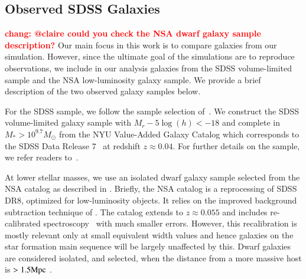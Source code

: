 \documentclass[preprint2,tighten]{aastex62}
\newcommand{\todo}[1]{{\bf \textcolor{red}{ #1}}}
\begin{document}
\subsection{Observed SDSS Galaxies} \label{sec:obvs}
\todo{chang: @claire could you check the NSA dwarf galaxy sample description?}
Our main focus in this work is to compare galaxies from our simulation. 
However, since the ultimate goal of the simulations are to reproduce 
observations, we include in our analysis galaxies from the 
SDSS volume-limited sample and the NSA low-luminosity galaxy sample. 
We provide a brief description of the two observed galaxy samples 
below. 

For the SDSS sample, we follow the sample selection of~\cite{tinker2011}. 
We construct the SDSS volume-limited galaxy sample with $M_r - 5\log(h) < -18$ 
and complete in $M_* > 10^{9.7} M_\odot$ from the NYU Value-Added 
Galaxy Catalog \citep[VAGC;][]{blanton2005} which corresponds to 
the SDSS Data Release 7~\citep[DR7;][]{abazajian2009} at redshift 
$z \approx 0.04$. For further details on the sample, we refer readers 
to~\cite{tinker2011,wetzel2013,hahn2017}.

At lower stellar masses, we use an isolated dwarf galaxy sample selected from the NSA catalog as described in \citet{geha2012}. Briefly, the NSA catalog is a reprocessing of SDSS DR8, optimized for low-luminosity 
objects. It relies on the improved background subtraction technique of 
\cite{blanton2011}. The catalog extends to $z \approx 0.055$ and includes 
re-calibrated spectroscopy~\citep{yan2011,yan2012} with much
smaller errors. However, this recalibration is mostly relevant only at small 
equivalent width values and hence galaxies on the star formation main 
sequence will be largely unaffected by this. Dwarf galaxies are considered isolated, and selected, when the distance from a more massive host is $> 1.5 {\rm Mpc}$ \citep{geha2012}.
\end{document}
